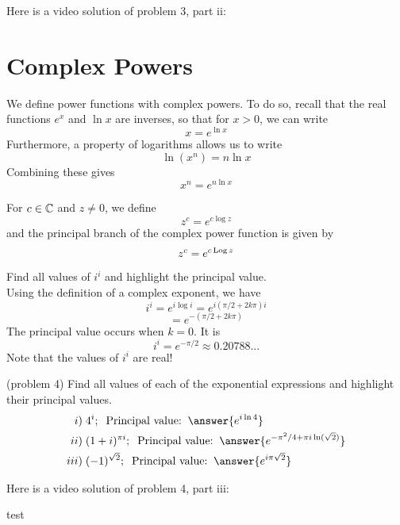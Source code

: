 \documentclass[handout]{ximera}
\begin{document}
Here is a video solution of problem 3, part ii:\\
\begin{foldable}
\end{foldable}



\section{Complex Powers}
We define power functions with complex powers. To do so, recall that the real functions $e^x$ and $\ln x$ 
are inverses, so that for $x>0$, we can write
\[
x = e^{\ln x}
\]
Furthermore, a property of logarithms allows us to write
\[
\ln(x^n) = n \ln x
\]
Combining these gives
\[
x^n = e^{n\ln x}
\]
\begin{definition}
For $c \in \mathbb C$ and $z \neq 0$, we define
\[
z^c = e^{c \log z}
\]
and the principal branch of the complex power function is given by
\[
z^c = e^{c \operatorname{Log} z}
\]
\end{definition}

\begin{example}[example 4]
Find all values of $i^i$ and highlight the principal value.\\
Using the definition of a complex exponent, we have
\[
i^i = e^{i\log i} = e^{i(\pi/2 + 2k\pi)i} 
\]
\[
= e^{-(\pi/2 + 2k\pi)}
\]
The principal value occurs when $k=0$.  It is
\[
i^i = e^{-\pi/2} \approx 0.20788...
\]
Note that the values of $i^i$ are real!
\end{example}

\begin{problem}(problem 4)
Find all values of each of the exponential expressions and highlight their principal values.\\
\begin{align*}
i) &\; 4^i; \;\; \mbox{Principal value:}\;\; \answer{e^{i\ln 4}}\\
ii) & \;(1+i)^{\pi i}; \;\;\mbox{Principal value:}\;\; \answer{e^{-\pi^2/4 + \pi i \ln(\sqrt2)}}\\
iii) & \;(-1)^{\sqrt 2}; \;\;\mbox{Principal value:}\;\; \answer{e^{i\pi\sqrt 2}}
\end{align*}
\end{problem}

Here is a video solution of problem 4, part iii:\\
\begin{foldable}
\end{foldable}

test
\end{document}
